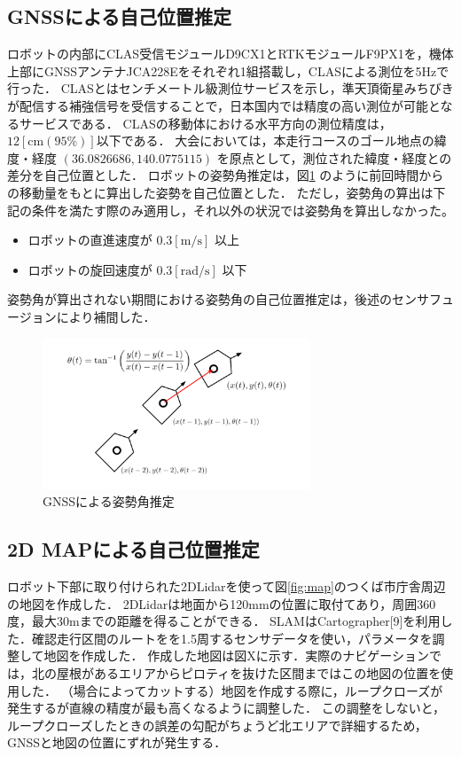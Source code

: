 \documentclass[platex,dvipdfmx]{rbproceedings}
\begin{document}
\subsection{GNSSによる自己位置推定}
ロボットの内部にCLAS受信モジュールD9CX1とRTKモジュールF9PX1を，機体上部にGNSSアンテナJCA228Eをそれぞれ1組搭載し，CLASによる測位を5Hzで行った．
CLASとはセンチメートル級測位サービスを示し，準天頂衛星みちびきが配信する補強信号を受信することで，日本国内では精度の高い測位が可能となるサービスである．
CLASの移動体における水平方向の測位精度は，$12[\mathrm{cm} (95 \%)]$以下である．
大会においては，本走行コースのゴール地点の緯度・経度 $(36.0826686 ,140.0775115)$ を原点として，測位された緯度・経度との差分を自己位置とした．
ロボットの姿勢角推定は，図\ref{fig:gnss_orientaiton} のように前回時間からの移動量をもとに算出した姿勢を自己位置とした．
ただし，姿勢角の算出は下記の条件を満たす際のみ適用し，それ以外の状況では姿勢角を算出しなかった。
\begin{itemize}
    \item ロボットの直進速度が $0.3[\mathrm{m/s}]$ 以上
    \item ロボットの旋回速度が $0.3[\mathrm{rad/s}]$ 以下
\end{itemize}
姿勢角が算出されない期間における姿勢角の自己位置推定は，後述のセンサフュージョンにより補間した．



\begin{figure}[h]
    \centering   
    \includegraphics[keepaspectratio,width=80mm]{fig/gnss_orientation.png}
    \caption{GNSSによる姿勢角推定}
    \label{fig:gnss_orientaiton}
\end{figure}

\subsection{2D MAPによる自己位置推定}
ロボット下部に取り付けられた2DLidarを使って図\ref{fig:map}のつくば市庁舎周辺の地図を作成した．
2DLidarは地面から120mmの位置に取付てあり，周囲360度，最大30mまでの距離を得ることができる．
SLAMはCartographer[9]を利用した．確認走行区間のルートをを1.5周するセンサデータを使い，パラメータを調整して地図を作成した．
作成した地図は図Xに示す．実際のナビゲーションでは，北の屋根があるエリアからピロティを抜けた区間まではこの地図の位置を使用した．
（場合によってカットする）地図を作成する際に，ループクローズが発生するが直線の精度が最も高くなるように調整した．
この調整をしないと，ループクローズしたときの誤差の勾配がちょうど北エリアで詳細するため，GNSSと地図の位置にずれが発生する．
\end{document}
